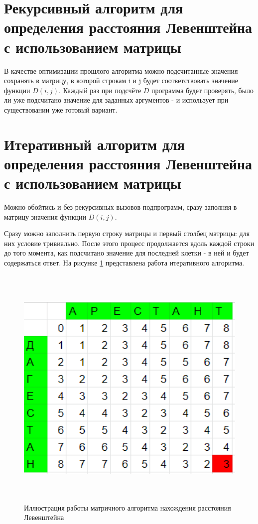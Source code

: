 \section{Рекурсивный алгоритм для определения расстояния Левенштейна с использованием матрицы}
В качестве оптимизации прошлого алгоритма можно подсчитанные значения сохранять в матрицу, в которой строкам i и j будет соответствовать значение функции $D(i, j)$. Каждый раз при подсчёте $D$ программа будет проверять, было ли уже подсчитано значение для заданных аргументов - и использует при существовании уже готовый вариант.

\section{Итеративный алгоритм для определения расстояния Левенштейна с использованием матрицы}
Можно обойтись и без рекурсивных вызовов подпрограмм, сразу заполняя в матрицу значения функции $D(i, j)$.

Сразу можно заполнить первую строку матрицы и первый столбец матрицы: для них условие тривиально. 
После этого процесс продолжается вдоль каждой строки до того момента, как подсчитано значение для последней клетки - в ней и будет содержаться ответ.
На рисунке \ref{fig:my_label} представлена работа итеративного алгоритма.


\begin{figure}[h]
    \begin{center}
        \includegraphics[width=13cm, height=12cm]{inc/МатрЛевен.png}
    \end{center}
    \caption{Иллюстрация работы матричного алгоритма нахождения расстояния Левенштейна}
    \label{fig:my_label}
\end{figure}

